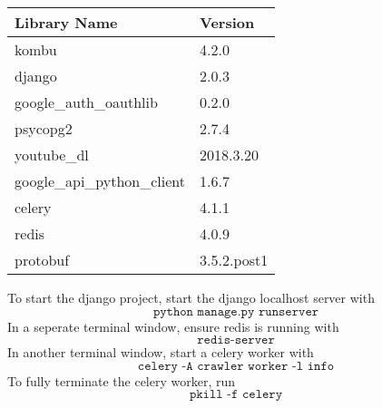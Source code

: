 \documentclass[11pt]{memoir}
\begin{document}
\begin{center}
\begin{tabular}{@{}|l|l|@{}}
\toprule
Library Name                & Version     \\ \midrule
kombu                       & 4.2.0       \\ \midrule
django                      & 2.0.3       \\ \midrule
google\_auth\_oauthlib      & 0.2.0       \\ \midrule
psycopg2                    & 2.7.4       \\ \midrule
youtube\_dl                 & 2018.3.20   \\ \midrule
google\_api\_python\_client & 1.6.7       \\ \midrule
celery                      & 4.1.1       \\ \midrule
redis                       & 4.0.9       \\ \midrule
protobuf                    & 3.5.2.post1 \\ \bottomrule
\end{tabular}
\end{center}
To start the django project, start the django localhost server with
$$\texttt{python manage.py runserver}$$
In a seperate terminal window, ensure redis is running with
$$\texttt{redis-server}$$
In another terminal window, start a celery worker with
$$\texttt{celery -A crawler worker -l info}$$
To fully terminate the celery worker, run
$$\texttt{pkill -f celery}$$
\end{document}
